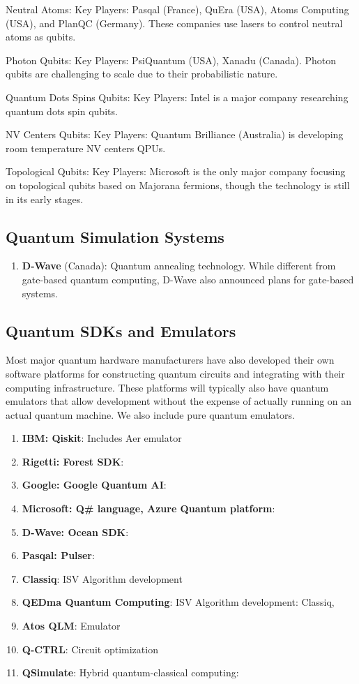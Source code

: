 Neutral Atoms:  Key Players: Pasqal (France), QuEra (USA), Atoms Computing (USA), and PlanQC (Germany).
 These companies use lasers to control neutral atoms as qubits.

Photon Qubits: Key Players: PsiQuantum (USA), Xanadu (Canada).
 Photon qubits are challenging to scale due to their probabilistic nature.

Quantum Dots Spins Qubits: Key Players: Intel is a major company researching quantum dots spin qubits.

NV Centers Qubits: Key Players: Quantum Brilliance (Australia) is developing room temperature NV centers QPUs.

Topological Qubits: Key Players: Microsoft is the only major company focusing on topological qubits based on Majorana fermions, though the technology is still in its early stages.


\subsection{Quantum Simulation Systems}

\begin{enumerate}
\item \textbf{D-Wave} (Canada): Quantum annealing technology.  While different from gate-based quantum computing,
  D-Wave also announced plans for gate-based systems.
\end{enumerate}


\subsection{Quantum SDKs and Emulators}

Most major quantum hardware manufacturers have also developed their own software platforms for constructing quantum
circuits and integrating with their computing infrastructure.
These platforms will typically also have quantum emulators that allow development without the expense of actually
running on an actual quantum machine.
We also include pure quantum emulators.

\begin{enumerate}
\item \textbf{IBM: Qiskit}: Includes Aer emulator
\item \textbf{Rigetti: Forest SDK}:
\item \textbf{Google: Google Quantum AI}:
\item \textbf{Microsoft: Q\# language, Azure Quantum platform}:
\item \textbf{D-Wave: Ocean SDK}:
\item \textbf{Pasqal: Pulser}:
\item \textbf{Classiq}: ISV Algorithm development
\item \textbf{QEDma Quantum Computing}: ISV Algorithm development: Classiq, 
\item \textbf{Atos QLM}: Emulator
\item \textbf{Q-CTRL}: Circuit optimization
\item \textbf{QSimulate}: Hybrid quantum-classical computing: 
\end{enumerate}


